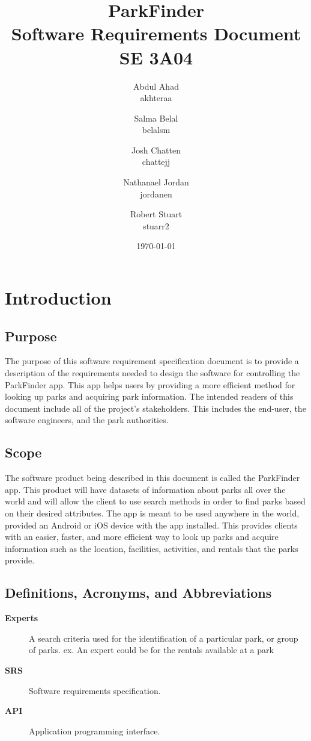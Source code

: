 \documentclass[titlepage]{article}
\title{ParkFinder\\Software Requirements Document\\SE 3A04}
\author{Abdul Ahad \\ akhteraa \and Salma Belal \\ belalsm \and Josh Chatten \\
chattejj \and Nathanael Jordan \\ jordanen \and Robert Stuart \\ stuarr2}
\date{\today}
\begin{document}
\maketitle	
\thispagestyle{empty}
\clearpage
\setcounter{tocdepth}{2}%
\tableofcontents
\clearpage

\section{Introduction}%
\label{sec:introduction}


\subsection{Purpose}%
\label{sub:purpose}
The purpose of this software requirement specification document is to provide a description of the
requirements needed to design the software for controlling the ParkFinder app. This app helps users
by providing a more efficient method for looking up parks and acquiring park information.
\newline\newline
The intended readers of this document include all of the project’s stakeholders. This includes the
end-user, the software engineers, and the park authorities.

\subsection{Scope}%
\label{sub:scope}
The software product being described in this document is called the ParkFinder app. This product
will have datasets of information about parks all over the world and will allow the client to use
search methods in order to find parks based on their desired attributes. The app is meant to be used
anywhere in the world, provided an Android or iOS device with the app installed. This provides
clients with an easier, faster, and more efficient way to look up parks and acquire information such
as the location, facilities, activities, and rentals that the parks provide.

\subsection{Definitions, Acronyms, and Abbreviations}%
\label{sub:definitions_acronyms_and_abbreviations}
\begin{description}
    \item[\textbf{Experts}] A search criteria used for the identification of a particular park, or
    group of parks. ex. An expert could be for the rentals available at a park
    \item[\textbf{SRS}] Software requirements specification.
    \item[\textbf{API}] Application programming interface.
\end{description}
\end{document}
